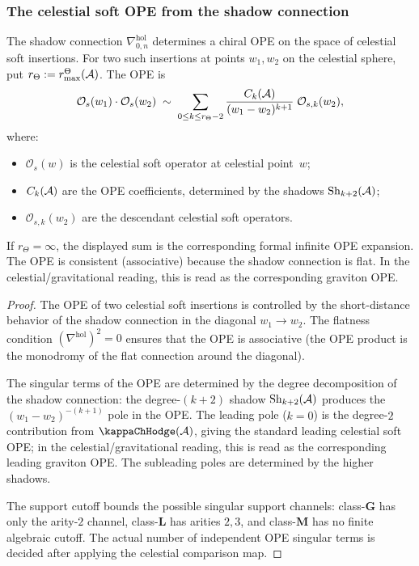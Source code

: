 \subsubsection{The celestial soft OPE from the shadow connection}

\begin{theorem}
The shadow connection $\nabla^{\mathrm{hol}}_{0,n}$ determines a
chiral OPE on the space of celestial soft insertions. For two such
insertions at points \(w_1,w_2\) on the celestial sphere, put
\(r_\Theta:=r^\Theta_{\max}(\mathcal{A})\). The OPE is
\begin{equation}%
\mathcal{O}_s(w_1) \cdot \mathcal{O}_s(w_2)
\;\sim\;
\sum_{0\le k\le r_\Theta-2}
\frac{C_k(\cA)}{(w_1 - w_2)^{k+1}}\;\mathcal{O}_{s,k}(w_2),
\end{equation}
where:
\begin{itemize}
\item $\mathcal{O}_s(w)$ is the celestial soft operator at
 celestial point~$w$;
\item $C_k(\mathcal{A})$ are the OPE coefficients, determined by the
 shadows $\operatorname{Sh}_{k+2}(\mathcal{A})$;
\item $\mathcal{O}_{s,k}(w_2)$ are the descendant celestial soft operators.
\end{itemize}
If \(r_\Theta=\infty\), the displayed sum is the corresponding
formal infinite OPE expansion.
The OPE is consistent (associative) because the shadow connection
is flat. In the celestial/gravitational reading, this is read as the
corresponding graviton OPE.
\end{theorem}

\begin{proof}
The OPE of two celestial soft insertions is controlled by the short-distance
behavior of the shadow connection in the diagonal
$w_1 \to w_2$. The flatness condition
$(\nabla^{\mathrm{hol}})^2 = 0$ ensures that the OPE is
associative (the OPE product is the monodromy of the flat
connection around the diagonal).

The singular terms of the OPE are determined by the degree
decomposition of the shadow connection:
the degree-$(k+2)$ shadow $\operatorname{Sh}_{k+2}(\mathcal{A})$ produces the
$(w_1 - w_2)^{-(k+1)}$ pole in the OPE. The leading pole
($k=0$) is the degree-$2$ contribution from $\kappaChHodge(\cA)$,
giving the standard leading celestial soft OPE; in the
celestial/gravitational reading, this is read as the corresponding
leading graviton OPE.
The subleading poles are determined by the higher shadows.

The support cutoff bounds the possible singular support channels:
class-$\mathbf{G}$ has only the arity-$2$ channel, class-$\mathbf{L}$
has arities \(2,3\), and class-$\mathbf{M}$ has no finite algebraic
cutoff.  The actual number of independent OPE singular terms is
decided after applying the celestial comparison map.
\end{proof}

